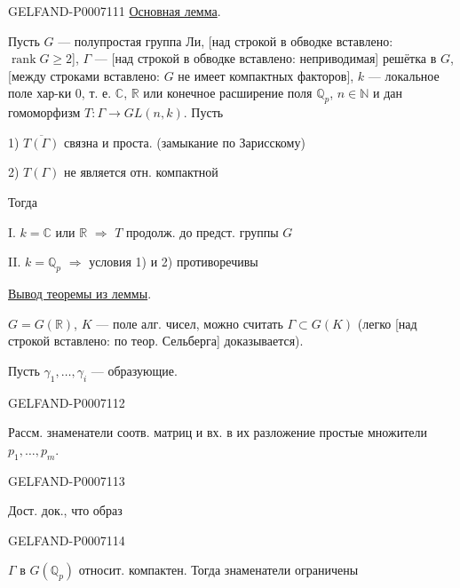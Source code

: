 \begin{GelfandAdjacentEvidence}{GELFAND-P000711}{1}
\underline{Основная лемма}.

Пусть \(G\) --- полупростая группа Ли,
[над строкой в обводке вставлено: \(\operatorname{rank}G\ge 2\)],
\(\Gamma\) --- [над строкой в обводке вставлено: неприводимая] решётка в \(G\),
[между строками вставлено: \(G\) не имеет компактных факторов],
\(k\) --- локальное поле хар-ки \(0\), т. е. \(\mathbb C\), \(\mathbb R\) или конечное расширение поля
\(\mathbb Q_p\), \(n\in\mathbb N\) и дан гомоморфизм
\(T:\Gamma\longrightarrow GL(n,k)\). Пусть

1) \(\overline{T(\Gamma)}\) связна и проста.
(замыкание по Зарисскому)

2) \(T(\Gamma)\) не является отн. компактной

Тогда

I. \(k=\mathbb C\) или \(\mathbb R\)
\(\Rightarrow\) \(T\) продолж. до предст. группы \(G\)

II. \(k=\mathbb Q_p\) \(\Rightarrow\) условия 1) и 2) противоречивы

\underline{Вывод теоремы из леммы}.

\(G=G(\mathbb R)\), \(K\) --- поле алг. чисел,
можно считать \(\Gamma\subset G(K)\)
(легко [над строкой вставлено: по теор. Сельберга] доказывается).

Пусть
\(\gamma_1,\ldots,\gamma_i\) --- образующие.
\end{GelfandAdjacentEvidence}
\begin{GelfandAdjacentEvidence}{GELFAND-P000711}{2}

Рассм. знаменатели соотв. матриц и вх. в их разложение простые множители \(p_1,\ldots,p_m\).
\end{GelfandAdjacentEvidence}
\begin{GelfandAdjacentEvidence}{GELFAND-P000711}{3}


Дост. док., что образ
\end{GelfandAdjacentEvidence}
\begin{GelfandAdjacentEvidence}{GELFAND-P000711}{4}

\(\Gamma\) в \(G(\mathbb Q_p)\) относит. компактен.
Тогда знаменатели ограничены
\end{GelfandAdjacentEvidence}

